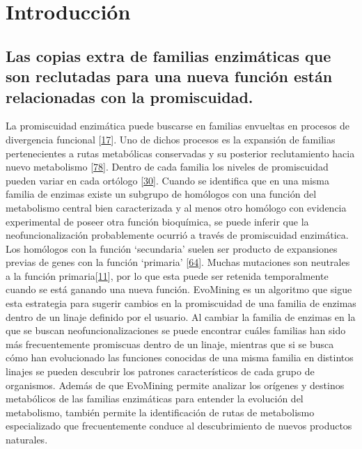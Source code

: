 \documentclass[12pt,twoside]{reedthesis}
\begin{document}
  \section{Introducción}\label{introduccion-1}
  
  \subsection{Las copias extra de familias enzimáticas que son reclutadas
  para una nueva función están relacionadas con la
  promiscuidad.}\label{las-copias-extra-de-familias-enzimaticas-que-son-reclutadas-para-una-nueva-funcion-estan-relacionadas-con-la-promiscuidad.}
  
  La promiscuidad enzimática puede buscarse en familias envueltas en
  procesos de divergencia funcional
  {[}\protect\hyperlink{ref-jensen_enzyme_1976}{17}{]}. Uno de dichos
  procesos es la expansión de familias pertenecientes a rutas metabólicas
  conservadas y su posterior reclutamiento hacia nuevo metabolismo
  {[}\protect\hyperlink{ref-caetano-anolles_origin_metabolism_2009}{78}{]}.
  Dentro de cada familia los niveles de promiscuidad pueden variar en cada
  ortólogo {[}\protect\hyperlink{ref-khanal_differential_2015}{30}{]}.
  Cuando se identifica que en una misma familia de enzimas existe un
  subgrupo de homólogos con una función del metabolismo central bien
  caracterizada y al menos otro homólogo con evidencia experimental de
  poseer otra función bioquímica, se puede inferir que la
  neofuncionalización probablemente ocurrió a través de promiscuidad
  enzimática. Los homólogos con la función `secundaria' suelen ser
  producto de expansiones previas de genes con la función `primaria'
  {[}\protect\hyperlink{ref-huang_enzyme_2012}{64}{]}. Muchas mutaciones
  son neutrales a la función
  primaria{[}\protect\hyperlink{ref-bloom_neutral_2007}{11}{]}, por lo que
  esta puede ser retenida temporalmente cuando se está ganando una nueva
  función. EvoMining es un algoritmo que sigue esta estrategia para
  sugerir cambios en la promiscuidad de una familia de enzimas dentro de
  un linaje definido por el usuario. Al cambiar la familia de enzimas en
  la que se buscan neofuncionalizaciones se puede encontrar cuáles
  familias han sido más frecuentemente promiscuas dentro de un linaje,
  mientras que si se busca cómo han evolucionado las funciones conocidas
  de una misma familia en distintos linajes se pueden descubrir los
  patrones característicos de cada grupo de organismos. Además de que
  EvoMining permite analizar los orígenes y destinos metabólicos de las
  familias enzimáticas para entender la evolución del metabolismo, también
  permite la identificación de rutas de metabolismo especializado que
  frecuentemente conduce al descubrimiento de nuevos productos naturales.
  
\end{document}
